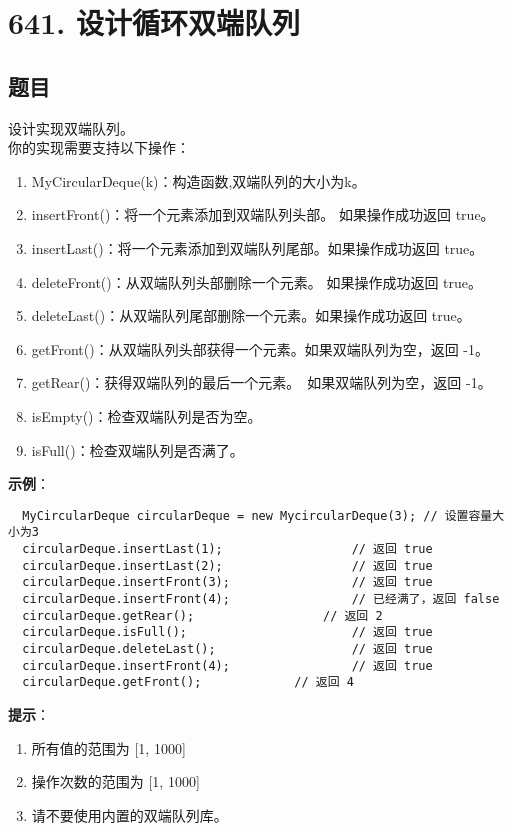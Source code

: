 \newpage
\section{641. 设计循环双端队列}
\label{leetcode:641}

\subsection{题目}

设计实现双端队列。\\
你的实现需要支持以下操作：

\begin{enumerate}
  \item MyCircularDeque(k)：构造函数,双端队列的大小为k。
  \item insertFront()：将一个元素添加到双端队列头部。 如果操作成功返回 true。
  \item insertLast()：将一个元素添加到双端队列尾部。如果操作成功返回 true。
  \item deleteFront()：从双端队列头部删除一个元素。 如果操作成功返回 true。
  \item deleteLast()：从双端队列尾部删除一个元素。如果操作成功返回 true。
  \item getFront()：从双端队列头部获得一个元素。如果双端队列为空，返回 -1。
  \item getRear()：获得双端队列的最后一个元素。 如果双端队列为空，返回 -1。
  \item isEmpty()：检查双端队列是否为空。
  \item isFull()：检查双端队列是否满了。
\end{enumerate}

\textbf{示例}：

\begin{verbatim}
  MyCircularDeque circularDeque = new MycircularDeque(3); // 设置容量大小为3
  circularDeque.insertLast(1);			        // 返回 true
  circularDeque.insertLast(2);			        // 返回 true
  circularDeque.insertFront(3);			        // 返回 true
  circularDeque.insertFront(4);			        // 已经满了，返回 false
  circularDeque.getRear();  				// 返回 2
  circularDeque.isFull();				        // 返回 true
  circularDeque.deleteLast();			        // 返回 true
  circularDeque.insertFront(4);			        // 返回 true
  circularDeque.getFront();				// 返回 4
\end{verbatim}

\textbf{提示}：

\begin{enumerate}
  \item 所有值的范围为 [1, 1000]
  \item 操作次数的范围为 [1, 1000]
  \item 请不要使用内置的双端队列库。
\end{enumerate}

